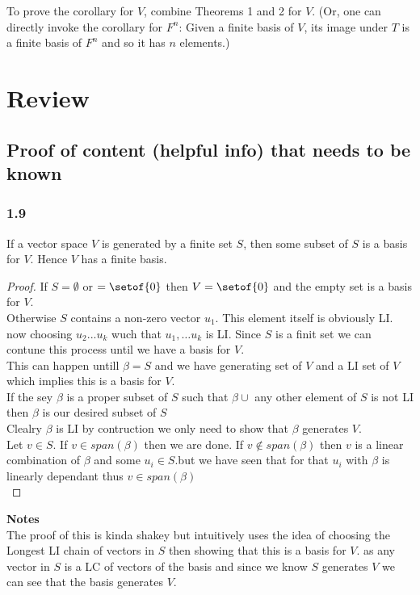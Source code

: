 \documentclass[answers,12pt,addpoints]{exam}
\begin{document}
        To prove the corollary for $V$, combine Theorems 1 and 2 for $V$. (Or, one can directly invoke the corollary for $F^n$: Given a finite basis of $V$, its image under $T$ is a finite basis of $F^n$ and so it has $n$ elements.)
\section{Review}

\subsection{Proof of content (helpful info) that needs to be known}
\subsubsection{1.9}
If a vector space $V$ is generated by a finite set $S$, then some subset of $S$ is a basis for $V$. Hence $V$ has a finite basis.
\begin{proof}
    If $S = \emptyset$ or $= \setof{0}$ then $V = \setof{0}$ and the empty set is a basis for $V$.\\
    Otherwise $S$ contains a non-zero vector $u_1$. This element itself is obviously LI. now choosing $u_2 ... u_k$ wuch that $u_1, \dots u_k$ is LI. Since $S$ is a finit set we can contune this process until we have a basis for $V$.\\
    This can happen untill $\beta = S$ and we have generating set of $V$ and a LI set of $V$ which implies this is a basis for $V$.\\
    If the sey $\beta$ is a proper subset of $S$ such that $\beta \cup$ any other element of $S$ is not LI then $\beta$ is our desired subset of $S$\\
    Clealry $\beta$ is LI by contruction we only need to show that $\beta$ generates $V$.\\
    Let $v \in S$. If $v \in span(\beta)$ then we are done. If $v \notin span(\beta)$ then $v$ is a linear combination of $\beta$ and some $u_i \in S$.but we have seen that for that $u_i$ with $
    \beta$ is linearly dependant thus $v \in span(\beta)$\\
\end{proof}
\textbf{Notes} \\
The proof of this is kinda shakey but intuitively uses the idea of choosing the Longest LI chain of vectors in $S$ then showing that this is a basis for $V$. as any vector in $S$ is a LC of vectors of the basis and since we know $S$ generates $V$ we can see that the basis generates $V$.
\end{document}
